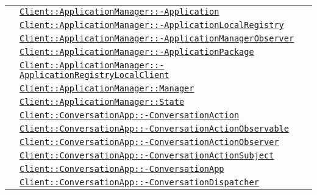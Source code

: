 \begin{longtable}{|>{\centering}m{3cm}|m{10cm}<{\centering}|}
& \hyperref[Client::ApplicationManager::Application]{\texttt{Client::ApplicationManager::-\linebreak Application}}\\
& \hyperref[Client::ApplicationManager::ApplicationLocalRegistry]{\texttt{Client::ApplicationManager::-\linebreak ApplicationLocalRegistry}}\\
& \hyperref[Client::ApplicationManager::ApplicationManagerObserver]{\texttt{Client::ApplicationManager::-\linebreak ApplicationManagerObserver}}\\
& \hyperref[Client::ApplicationManager::ApplicationPackage]{\texttt{Client::ApplicationManager::-\linebreak ApplicationPackage}}\\
& \hyperref[Client::ApplicationManager::ApplicationRegistryLocalClient]{\texttt{Client::ApplicationManager::-\linebreak ApplicationRegistryLocalClient}}\\
& \hyperref[Client::ApplicationManager::Manager]{\texttt{Client::ApplicationManager::Manager}}\\
& \hyperref[Client::ApplicationManager::State]{\texttt{Client::ApplicationManager::State}}\\
& \hyperref[Client::ConversationApp::ConversationAction]{\texttt{Client::ConversationApp::-\linebreak ConversationAction}}\\
& \hyperref[Client::ConversationApp::ConversationActionObservable]{\texttt{Client::ConversationApp::-\linebreak ConversationActionObservable}}\\
& \hyperref[Client::ConversationApp::ConversationActionObserver]{\texttt{Client::ConversationApp::-\linebreak ConversationActionObserver}}\\
& \hyperref[Client::ConversationApp::ConversationActionSubject]{\texttt{Client::ConversationApp::-\linebreak ConversationActionSubject}}\\
& \hyperref[Client::ConversationApp::ConversationApp]{\texttt{Client::ConversationApp::-\linebreak ConversationApp}}\\
& \hyperref[Client::ConversationApp::ConversationDispatcher]{\texttt{Client::ConversationApp::-\linebreak ConversationDispatcher}}\\

\end{longtable}
